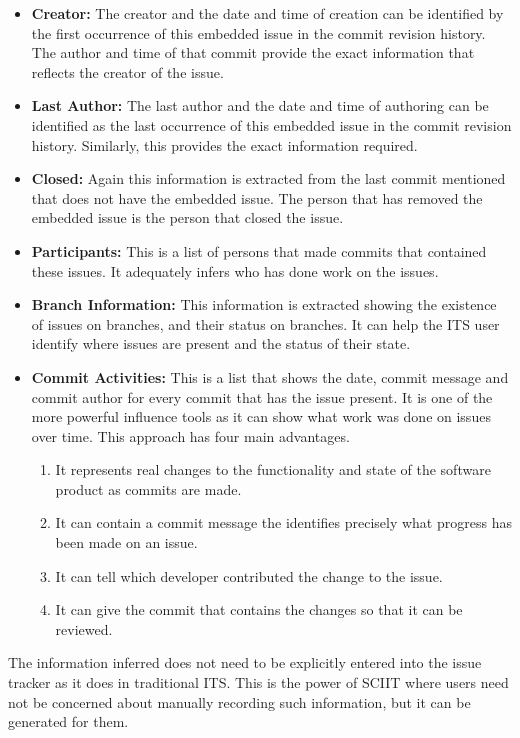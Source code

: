 \documentclass{mproj}
\begin{document}
\begin{itemize}
    \item \textbf{Creator:} The creator and the date and time of creation can be identified by the first occurrence of this embedded issue in the commit revision history. The author and time of that commit provide the exact information that reflects the creator of the issue.
    \item \textbf{Last Author:} The last author and the date and time of authoring can be identified as the last occurrence of this embedded issue in the commit revision history. Similarly, this provides the exact information required.
    \item \textbf{Closed:} Again this information is extracted from the last commit mentioned that does not have the embedded issue. The person that has removed the embedded issue is the person that closed the issue.
    \item \textbf{Participants:} This is a list of persons that made commits that contained these issues. It adequately infers who has done work on the issues.
    \item \textbf{Branch Information:} This information is extracted showing the existence of issues on branches, and their status on branches. It can help the ITS user identify where issues are present and the status of their state.
    \item \textbf{Commit Activities:} This is a list that shows the date, commit message and commit author for every commit that has the issue present. It is one of the more powerful influence tools as it can show what work was done on issues over time. This approach has four main advantages.

  \begin{enumerate}
    \item It represents real changes to the functionality and state of the software product as commits are made.
    \item It can contain a commit message the identifies precisely what progress has been made on an issue.
    \item It can tell which developer contributed the change to the issue.
    \item It can give the commit that contains the changes so that it can be reviewed.
  \end{enumerate}

\end{itemize}

The information inferred does not need to be explicitly entered into the issue tracker as it does in traditional ITS. This is the power of SCIIT where users need not be concerned about manually recording such information, but it can be generated for them.
\end{document}
